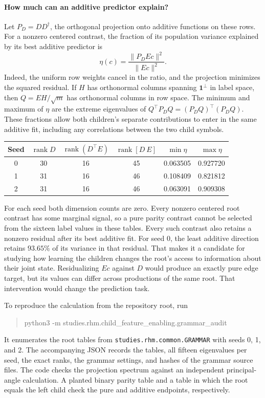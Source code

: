 \paragraph{How much can an additive predictor explain?}
Let \(P_D=DD^\dagger\), the orthogonal projection onto additive functions
on these rows. For a nonzero centered contrast, the fraction of its
population variance explained by its best additive predictor is
\[
 \eta(c)=\frac{\|P_D Ec\|^2}{\|Ec\|^2}.
\]
Indeed, the uniform row weights cancel in the ratio, and the projection
minimizes the squared residual. If \(H\) has orthonormal columns spanning
\(\mathbf 1^\perp\) in label space, then \(Q=EH/\sqrt m\) has orthonormal
columns in row space. The minimum and maximum of \(\eta\) are the extreme
eigenvalues of \(Q^\top P_DQ=(P_DQ)^\top(P_DQ)\). These fractions allow
both children's separate contributions to enter in the same additive fit,
including any correlations between the two child symbols.

\begin{center}
\begin{tabular}{c|ccc|cc}
Seed & \(\operatorname{rank}D\) & \(\operatorname{rank}(D^\top E)\)
& \(\operatorname{rank}[D\ E]\) & \(\min\eta\) & \(\max\eta\)\\ \hline
0 & 30 & 16 & 45 & 0.063505 & 0.927720\\
1 & 31 & 16 & 46 & 0.108409 & 0.821812\\
2 & 31 & 16 & 46 & 0.063091 & 0.909308
\end{tabular}
\end{center}

For each seed both dimension counts are zero. Every nonzero centered root
contrast has some marginal signal, so a pure parity contrast cannot be
selected from the sixteen label values in these tables. Every such contrast
also retains a nonzero residual after its best additive fit. For seed 0,
the least additive direction retains \(93.65\%\) of its variance in that
residual. That makes it a candidate for studying how learning the children
changes the root's access to information about their joint state.
Residualizing \(Ec\) against \(D\) would produce an exactly pure edge
target, but its values can differ across productions of the same root.
That intervention would change the prediction task.

To reproduce the calculation from the repository root, run
\begin{quote}
\small\ttfamily python3 -m studies.rhm.child\_feature\_enabling.grammar\_audit
\end{quote}
It enumerates the root tables from \texttt{studies.rhm.common.GRAMMAR}
with seeds 0, 1, and 2. The accompanying JSON records the tables, all
fifteen eigenvalues per seed, the exact ranks, the grammar settings, and
hashes of the grammar source files. The code checks the projection spectrum
against an independent principal-angle calculation. A planted binary parity
table and a table in which the root equals the left child check the pure
and additive endpoints, respectively.
